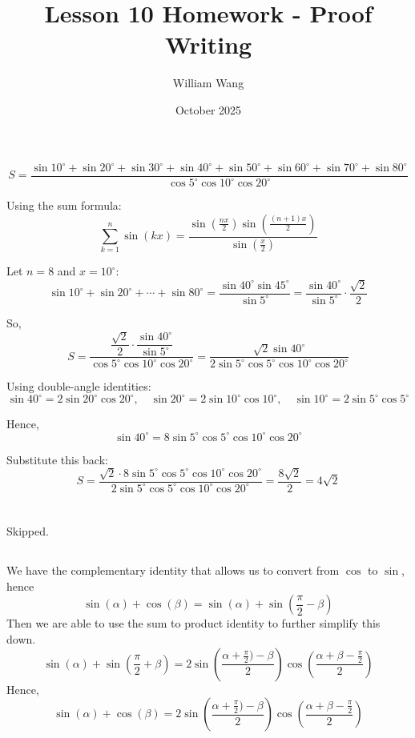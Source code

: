 \documentclass{article}
\title{Lesson 10 Homework - Proof Writing}
\author{William Wang}
\date{October 2025}
\begin{document}
\maketitle

\section{}
\[
S = \frac{\sin 10^\circ + \sin 20^\circ + \sin 30^\circ + \sin 40^\circ + \sin 50^\circ + \sin 60^\circ + \sin 70^\circ + \sin 80^\circ}{\cos 5^\circ \cos 10^\circ \cos 20^\circ}
\]

Using the sum formula:
\[
\sum_{k=1}^{n} \sin(kx) = \frac{\sin\left(\frac{nx}{2}\right)\sin\left(\frac{(n+1)x}{2}\right)}{\sin\left(\frac{x}{2}\right)}
\]

Let \( n = 8 \) and \( x = 10^\circ \):
\[
\sin 10^\circ + \sin 20^\circ + \cdots + \sin 80^\circ = \frac{\sin 40^\circ \sin 45^\circ}{\sin 5^\circ} = \frac{\sin 40^\circ}{\sin 5^\circ} \cdot \frac{\sqrt{2}}{2}
\]

So,
\[
S = \frac{\dfrac{\sqrt{2}}{2} \cdot \dfrac{\sin 40^\circ}{\sin 5^\circ}}{\cos 5^\circ \cos 10^\circ \cos 20^\circ}
= \frac{\sqrt{2} \sin 40^\circ}{2 \sin 5^\circ \cos 5^\circ \cos 10^\circ \cos 20^\circ}
\]

Using double-angle identities:
\[
\sin 40^\circ = 2 \sin 20^\circ \cos 20^\circ, \quad
\sin 20^\circ = 2 \sin 10^\circ \cos 10^\circ, \quad
\sin 10^\circ = 2 \sin 5^\circ \cos 5^\circ
\]

Hence,
\[
\sin 40^\circ = 8 \sin 5^\circ \cos 5^\circ \cos 10^\circ \cos 20^\circ
\]

Substitute this back:
\[
S = \frac{\sqrt{2} \cdot 8 \sin 5^\circ \cos 5^\circ \cos 10^\circ \cos 20^\circ}{2 \sin 5^\circ \cos 5^\circ \cos 10^\circ \cos 20^\circ}
= \frac{8\sqrt{2}}{2} = 4\sqrt{2}
\]

\section{}
\subsection{}
Skipped.
\subsection{}
We have the complementary identity that allows us to convert from $\cos$ to $\sin$, hence
\[\sin(\alpha) + \cos(\beta) = \sin(\alpha) + \sin(\frac{\pi}{2}-\beta)\]
Then we are able to use the sum to product identity to further simplify this down. 
\[\sin(\alpha) + \sin(\frac{\pi}{2}+\beta) = 2\sin(\frac{\alpha+\frac{\pi}{2})-\beta}{2})\cos(\frac{\alpha+\beta-\frac{\pi}{2}}{2})\]
Hence, 
\[\sin(\alpha)+\cos(\beta) = 2\sin(\frac{\alpha+\frac{\pi}{2})-\beta}{2})\cos(\frac{\alpha+\beta-\frac{\pi}{2}}{2})\]
\end{document}
